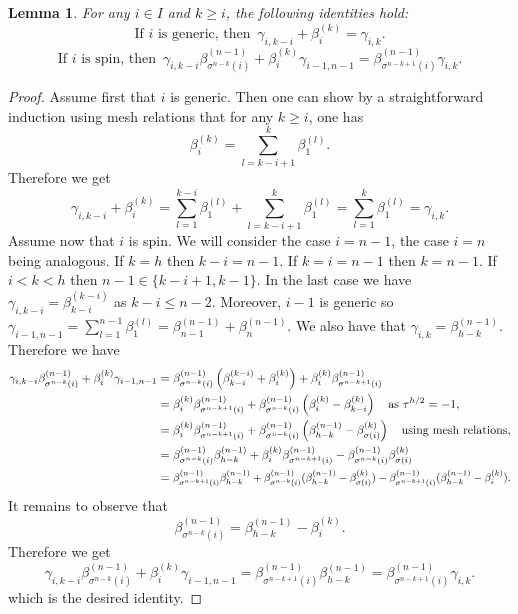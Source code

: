 \documentclass[12pt]{amsart}
\theoremstyle{plain}
\newtheorem{lemma}[theorem]{Lemma}
\theoremstyle{definition}
\numberwithin{equation}{section}
\newcommand\scalemath[2]{\scalebox{#1}{\mbox{\ensuremath{\displaystyle #2}}}}
\begin{document}
 \begin{lemma} \label{lem : identity from mesh relations}
   For any $i \in I$ and $k \geq i$, the following identities hold:
   $$ \text{If $i$ is generic, then} \enspace  \gamma_{i,k-i} + \beta_i^{(k)} = \gamma_{i,k} . $$
   $$ \text{If $i$ is spin, then} \enspace \gamma_{i,k-i} \beta_{\sigma^{n-k}(i)}^{(n-1)} + \beta_i^{(k)} \gamma_{i-1,n-1} =\beta_{\sigma^{n-k+1}(i)}^{(n-1)} \gamma_{i,k} . $$
 \end{lemma}

 \begin{proof}
  Assume first that $i$ is generic. Then one can show by a straightforward induction using mesh relations that for any $k \geq i$, one has 
  $$ \beta_i^{(k)} = \sum_{l=k-i+1}^{k} \beta_1^{(l)} .  $$
  Therefore we get 
  $$ \gamma_{i,k-i} + \beta_i^{(k)} = \sum_{l=1}^{k-i} \beta_1^{(l)} + \sum_{l=k-i+1}^{k}  \beta_1^{(l)} = \sum_{l=1}^k  \beta_1^{(l)} = \gamma_{i,k} . $$
  Assume now that $i$ is spin. We will consider the case $i=n-1$, the case $i=n$ being analogous. If $k=h$ then $k-i=n-1$. If $k=i=n-1$ then $k=n-1$.  If $i<k<h$ then $n-1 \in \{ k-i+1 , k-1 \}$. 
 In the last case we have  $\gamma_{i,k-i} = \beta_{k-i}^{(k-i)}$ as $k-i \leq n-2$. Moreover, $i-1$ is generic so $\gamma_{i-1,n-1} = \sum_{l=1}^{n-1} \beta_1^{(l)} = \beta_{n-1}^{(n-1)} + \beta_{n}^{(n-1)}$. 
 We also have that $\gamma_{i,k} = \beta_{h-k}^{(n-1)}$. Therefore we have 
 \begin{align*}
\gamma_{i,k-i} \beta_{\sigma^{n-k}(i)}^{(n-1)} + \beta_i^{(k)} \gamma_{i-1,n-1} &= \beta_{\sigma^{n-k}(i)}^{(n-1)} \left( \beta_{k-i}^{(k-i)} + \beta_i^{(k)} \right) + \beta_i^{(k)} \beta_{\sigma^{n-k+1}(i)}^{(n-1)}  \\
&=\beta_i^{(k)} \beta_{\sigma^{n-k+1}(i)}^{(n-1)} + \beta_{\sigma^{n-k}(i)}^{(n-1)} \left( \beta_i^{(k)} - \beta_{k-i}^{(k)} \right) \quad \text{as $\tau^{h/2}=- 1$,} \\
 &= \beta_i^{(k)} \beta_{\sigma^{n-k+1}(i)}^{(n-1)} + \beta_{\sigma^{n-k}(i)}^{(n-1)} \left( \beta_{h-k}^{(n-1)} - \beta_{\sigma(i)}^{(k)} \right) \quad \text{using mesh relations,} \\
 &= \beta_{\sigma^{n-k}(i)}^{(n-1)} \beta_{h-k}^{(n-1)} + \beta_i^{(k)} \beta_{\sigma^{n-k+1}(i)}^{(n-1)} - \beta_{\sigma^{n-k}(i)}^{(n-1)} \beta_{\sigma(i)}^{(k)} \\
& = \scalemath{0.92}{ \beta_{\sigma^{n-k+1}(i)}^{(n-1)} \beta_{h-k}^{(n-1)} + \beta_{\sigma^{n-k}(i)}^{(n-1)}(\beta_{h-k}^{(n-1)}- \beta_{\sigma(i)}^{(k)}) - \beta_{\sigma^{n-k+1}(i)}^{(n-1)}(\beta_{h-k}^{(n-1)} - \beta_{i}^{(k)}). } 
 \end{align*}
 It remains to observe that 
 $$ \beta_{\sigma^{n-k}(i)}^{(n-1)} =  \beta_{h-k}^{(n-1)} - \beta_i^{(k)}.  $$
 Therefore we get 
 $$\gamma_{i,k-i} \beta_{\sigma^{n-k}(i)}^{(n-1)} + \beta_i^{(k)} \gamma_{i-1,n-1} =\beta_{\sigma^{n-k+1}(i)}^{(n-1)} \beta_{h-k}^{(n-1)} = \beta_{\sigma^{n-k+1}(i)}^{(n-1)} \gamma_{i,k} . $$
 which is the desired identity.   
  \end{proof}
\end{document}
